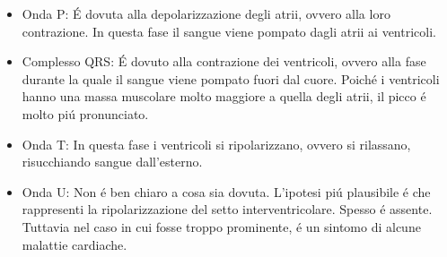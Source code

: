 \begin{itemize}
    \item{Onda P: É dovuta alla depolarizzazione degli atrii, ovvero alla loro contrazione. In questa fase il sangue viene
        pompato dagli atrii ai ventricoli.}
    \item{Complesso QRS: É dovuto alla contrazione dei ventricoli, ovvero alla fase durante la quale il sangue viene pompato
        fuori dal cuore. Poiché i ventricoli hanno una massa muscolare molto maggiore a quella degli atrii, il picco é molto piú
        pronunciato.}
    \item{Onda T: In questa fase i ventricoli si ripolarizzano, ovvero si rilassano, risucchiando sangue dall'esterno.}
    \item{Onda U: Non é ben chiaro a cosa sia dovuta. L'ipotesi piú plausibile é che rappresenti la ripolarizzazione del
        setto interventricolare. Spesso é assente. Tuttavia nel caso in cui fosse troppo prominente, é un sintomo di alcune malattie cardiache.}
\end{itemize}
